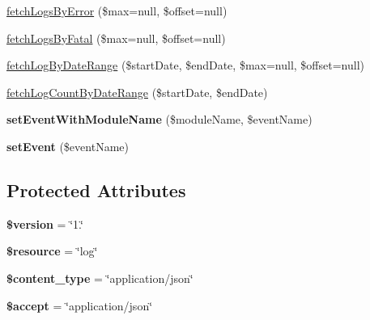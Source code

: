 \begin{DoxyCompactItemize}
\hyperlink{class_log_service_a88d6867d0a41ab835cda0c04e1e806cd}{fetch\+Logs\+By\+Error} (\$max=null, \$offset=null)
\item 
\hyperlink{class_log_service_a00030398115a30521018938aa7afd21f}{fetch\+Logs\+By\+Fatal} (\$max=null, \$offset=null)
\item 
\hyperlink{class_log_service_aee1936ded7bc9cd5d706c5a2499ce160}{fetch\+Log\+By\+Date\+Range} (\$start\+Date, \$end\+Date, \$max=null, \$offset=null)
\item 
\hyperlink{class_log_service_ae906b97075e3c2985a4b7f7b4dfd82a7}{fetch\+Log\+Count\+By\+Date\+Range} (\$start\+Date, \$end\+Date)
\item 
\hypertarget{class_log_service_a3f05ae22de792ac69493a82137b05ad9}{{\bfseries set\+Event\+With\+Module\+Name} (\$module\+Name, \$event\+Name)}\label{class_log_service_a3f05ae22de792ac69493a82137b05ad9}

\item 
\hypertarget{class_log_service_a3183068628956d205b9df5228c4b4551}{{\bfseries set\+Event} (\$event\+Name)}\label{class_log_service_a3183068628956d205b9df5228c4b4551}

\end{DoxyCompactItemize}
\subsection*{Protected Attributes}
\begin{DoxyCompactItemize}
\item 
\hypertarget{class_log_service_a17c8948c68aa44fa9961ae169b6a8961}{{\bfseries \$version} = \char`\"{}1.\char`\"{}}\label{class_log_service_a17c8948c68aa44fa9961ae169b6a8961}

\item 
\hypertarget{class_log_service_abd4c7b8b084214b8d2533ba07fce6b83}{{\bfseries \$resource} = \char`\"{}log\char`\"{}}\label{class_log_service_abd4c7b8b084214b8d2533ba07fce6b83}

\item 
\hypertarget{class_log_service_ae754d6373f275e781f47c8bc9b994b6d}{{\bfseries \$content\+\_\+type} = \char`\"{}application/json\char`\"{}}\label{class_log_service_ae754d6373f275e781f47c8bc9b994b6d}

\item 
\hypertarget{class_log_service_a75fc18c4ff06288ff9fdf8aba9bd1081}{{\bfseries \$accept} = \char`\"{}application/json\char`\"{}}\label{class_log_service_a75fc18c4ff06288ff9fdf8aba9bd1081}

\end{DoxyCompactItemize}
